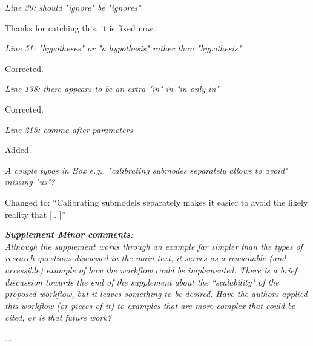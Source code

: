 \documentclass[11pt,letter]{article}
\begin{document}
\begin{mybox}
\emph{Line 39: should "ignore" be "ignores"}
\end{mybox}

Thanks for catching this, it is fixed now. 

\begin{mybox}
\emph{Line 51: "hypotheses" or "a hypothesis" rather than "hypothesis"}
\end{mybox}

Corrected.

\begin{mybox}
\emph{Line 138: there appears to be an extra "in" in "in only in"}
\end{mybox}

Corrected.

\begin{mybox}
\emph{Line 215: comma after parameters}
\end{mybox}

Added.

\begin{mybox}
\emph{A couple typos in Box e.g., "calibrating submodes separately allows to
avoid" missing "us"?}
\end{mybox}

Changed to: ``Calibrating submodels separately makes it easier to avoid the likely reality that [...]''

\begin{mybox}
\emph{\textbf{Supplement Minor comments:}\\
Although the supplement works through an example far simpler than the
types of research questions discussed in the main text, it serves as a
reasonable (and accessible) example of how the workflow could be
implemented. There is a brief discussion towards the end of the
supplement about the ``scalability" of the proposed workflow, but it
leaves something to be desired. Have the authors applied this workflow
(or pieces of it) to examples that are more complex that could be cited,
or is that future work?}
\end{mybox}

... %
\end{document}
